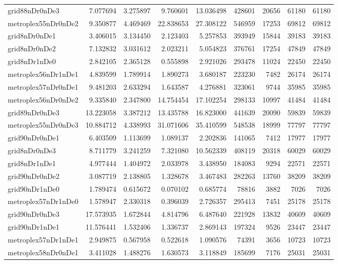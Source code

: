 \begin{longtable}{|l|r|r|r|r|r|r|r|r|}
grid88nDr0nDe3 & 7.077694 & 3.275897 & 9.760601 & 13.036498 & 428601 & 20656 & 61180 & 61180 \\
metroplex55nDr0nDe2 & 9.350877 & 4.469469 & 22.838653 & 27.308122 & 546959 & 17253 & 69812 & 69812 \\
grid8nDr0nDe1 & 3.406015 & 3.134450 & 2.123403 & 5.257853 & 393949 & 15844 & 39183 & 39183 \\
grid8nDr0nDe2 & 7.132832 & 3.031612 & 2.023211 & 5.054823 & 376761 & 17254 & 47849 & 47849 \\
grid8nDr1nDe0 & 2.842105 & 2.365128 & 0.555898 & 2.921026 & 293478 & 11024 & 22450 & 22450 \\
metroplex56nDr1nDe1 & 4.839599 & 1.789914 & 1.890273 & 3.680187 & 223230 & 7482 & 26174 & 26174 \\
metroplex57nDr0nDe1 & 9.481203 & 2.633294 & 1.643587 & 4.276881 & 323061 & 9744 & 35985 & 35985 \\
metroplex56nDr0nDe2 & 9.335840 & 2.347800 & 14.754454 & 17.102254 & 298133 & 10997 & 41484 & 41484 \\
grid89nDr0nDe3 & 13.223058 & 3.387212 & 13.435788 & 16.823000 & 441639 & 20090 & 59839 & 59839 \\
metroplex55nDr0nDe3 & 10.884712 & 4.338993 & 31.071606 & 35.410599 & 548538 & 18999 & 77797 & 77797 \\
grid90nDr0nDe1 & 6.403509 & 1.113699 & 1.089137 & 2.202836 & 141065 & 7412 & 17977 & 17977 \\
grid8nDr0nDe3 & 8.711779 & 3.241259 & 7.321080 & 10.562339 & 408119 & 20318 & 60029 & 60029 \\
grid8nDr1nDe1 & 4.977444 & 1.404972 & 2.033978 & 3.438950 & 184083 & 9294 & 22571 & 22571 \\
grid90nDr0nDe2 & 3.087719 & 2.138805 & 1.328678 & 3.467483 & 282263 & 13760 & 38209 & 38209 \\
grid90nDr1nDe0 & 1.789474 & 0.615672 & 0.070102 & 0.685774 & 78816 & 3882 & 7026 & 7026 \\
metroplex57nDr1nDe0 & 1.578947 & 2.330318 & 0.396039 & 2.726357 & 295413 & 7451 & 25178 & 25178 \\
grid90nDr0nDe3 & 17.573935 & 1.672844 & 4.814796 & 6.487640 & 221928 & 13832 & 40609 & 40609 \\
grid90nDr1nDe1 & 11.576441 & 1.532406 & 1.336737 & 2.869143 & 197324 & 9526 & 23447 & 23447 \\
metroplex57nDr1nDe1 & 2.949875 & 0.567958 & 0.522618 & 1.090576 & 74391 & 3656 & 10723 & 10723 \\
metroplex58nDr0nDe1 & 3.411028 & 1.488276 & 1.630573 & 3.118849 & 185699 & 7176 & 25031 & 25031 \\

\end{longtable}
